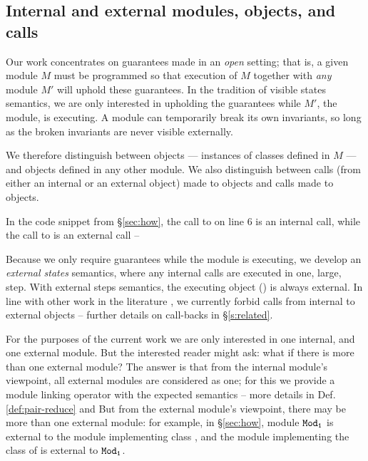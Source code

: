 { 

 
\subsection{Internal and external modules, objects, and calls}
\label{s:concepts}

Our work concentrates on guarantees made in an \emph{open} setting; that is, a given module
$M$ must be programmed so that 
execution of $M$ together with \emph{any} \externalM 
module $M'$ will uphold these guarantees. In the tradition of
visible states semantics, we are  only interested in upholding the guarantees while 
$M'$, the  \emph{\externalM} module, is executing. A module can
temporarily break its own invariants,
so long as the broken invariants are never visible externally.
   
We therefore distinguish between  \emph{\internalO}
objects --- instances of classes defined in $M$ ---
and \emph{\externalO} objects defined in any other module.
We also distinguish between
  \emph{\internalC} calls  (from either an internal or an external object)  made %
 to \internalO objects and \emph{\externalC} calls made %
 to \externalC objects. 
{In the code snippet from \S \ref{sec:how}, the call to  on line 6 is an 
 internal call, while the call to  is an external call -- 
 
%
%
Because we only require guarantees while 
the  \externalM module  is executing,
we develop an \emph{external states} semantics, where
 any internal calls are executed in one, large, step.
With external steps semantics,  the executing object () is always   external. 
  In line  with other work in the literature \cite{Permenev, Grossman, Albert}, we currently forbid 
  calls from internal to  external objects
  -- further details on call-backs in \S\ref{s:related}. 

{For the purposes of the current work we are only interested in one internal, and one external module.
But the interested reader might ask: what if there is more than one external module?
The answer is that from the internal module's viewpoint, all external modules are considered as one;
for this we provide a module linking operator with  the expected semantics -- more details in Def. \ref{def:pair-reduce} and  %
But from the external module's viewpoint, there may be more than one external module: for example, in \S \ref{sec:how}, 
module ${\texttt{Mod}}_{{\texttt{1}}}$ is external to the module   implementing class , and the module 
implementing the class of  is external to
${\texttt{Mod}}_{{\texttt{1}}}$.
}

}}
